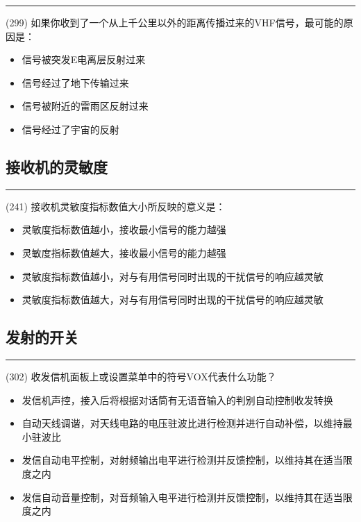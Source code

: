 \documentclass[twocolumn,hyperref,UTF8]{ctexart}  %
\begin{document}
\noindent\rule{0.5\textwidth}{1pt}
\heiti (299) 如果你收到了一个从上千公里以外的距离传播过来的VHF信号，最可能的原因是： \songti {\color{gray} [LK1116] }
\begin{itemize}
	\item  信号被突发E电离层反射过来
	\item  信号经过了地下传输过来
	\item  信号被附近的雷雨区反射过来
	\item  信号经过了宇宙的反射
\end{itemize}


\clearpage
\subsection{接收机的灵敏度}


\noindent\rule{0.5\textwidth}{1pt}
\heiti (241) 接收机灵敏度指标数值大小所反映的意义是： \songti {\color{gray} [LK0816] }
\begin{itemize}
	\item  灵敏度指标数值越小，接收最小信号的能力越强
	\item  灵敏度指标数值越大，接收最小信号的能力越强
	\item  灵敏度指标数值越小，对与有用信号同时出现的干扰信号的响应越灵敏
	\item  灵敏度指标数值越大，对与有用信号同时出现的干扰信号的响应越灵敏
\end{itemize}


\clearpage
\subsection{发射的开关}


\noindent\rule{0.5\textwidth}{1pt}
\heiti (302) 收发信机面板上或设置菜单中的符号VOX代表什么功能？ \songti {\color{gray} [LK0255] }
\begin{itemize}
	\item  发信机声控，接入后将根据对话筒有无语音输入的判别自动控制收发转换
	\item  自动天线调谐，对天线电路的电压驻波比进行检测并进行自动补偿，以维持最小驻波比
	\item  发信自动电平控制，对射频输出电平进行检测并反馈控制，以维持其在适当限度之内
	\item  发信自动音量控制，对音频输入电平进行检测并反馈控制，以维持其在适当限度之内
\end{itemize}
\end{document}
